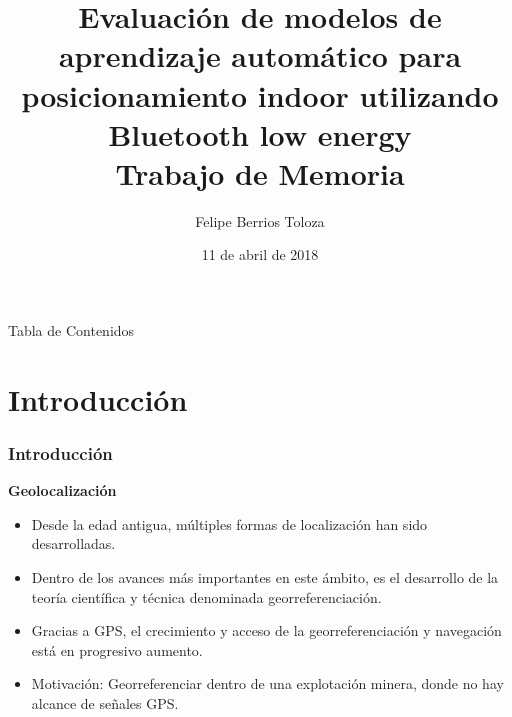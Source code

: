 \documentclass[mathserif]{beamer}
\title[Evaluación de modelos de aprendizaje automático
para posicionamiento indoor utilizando Bluetooth
low energy]{Evaluación de modelos de aprendizaje automático
para posicionamiento indoor utilizando Bluetooth
low energy\\\normalsize Trabajo de Memoria} %
\author{Felipe Berrios Toloza} %
\institute[UTFSM] %
{
Universidad Técnica Federico Santa María \\ %
\medskip
\textit{felipe.berriost@alumnos.usm.cl} %
}
\date{11 de abril de 2018} %
\begin{document}
\begin{frame}
\titlepage %
\end{frame}

\begin{frame}{Tabla de Contenidos}
\begin{multicols}{2}
  \tableofcontents
\end{multicols}
\end{frame}




\section{Introducción} 

\begin{frame}
\frametitle{Introducción}

\textbf{Geolocalización}
\begin{itemize}


\item Desde la edad antigua, múltiples formas de localización han sido desarrolladas.

\item Dentro de los avances más importantes en este ámbito, es el desarrollo de la teoría científica y técnica denominada georreferenciación.

\item Gracias a GPS, el crecimiento y acceso de la georreferenciación y navegación está en progresivo aumento.

\item Motivación: Georreferenciar dentro de una explotación minera, donde no hay alcance de señales GPS.

\end{itemize}



\end{frame}
\end{document}

